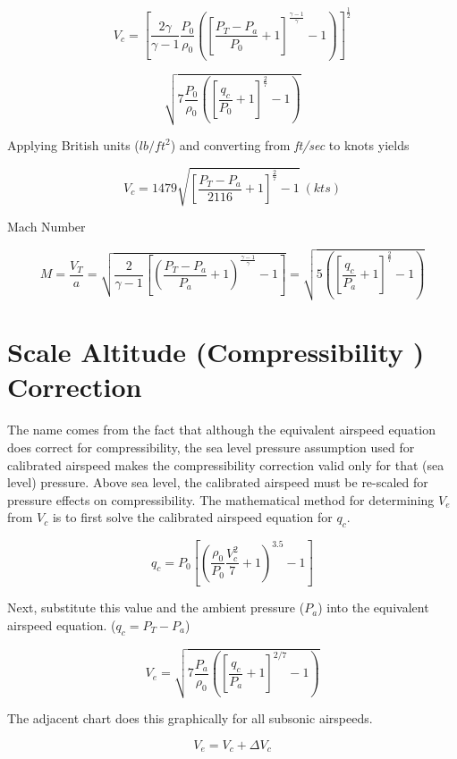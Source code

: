 \documentclass[
]{book}
\begin{document}
\[V_{c} = \left\lbrack \frac{2\gamma}{\gamma - 1}\frac{P_0}{\rho_0}\left( \left\lbrack \frac{P_{T} - P_{a}}{P_0} + 1 \right\rbrack^{\frac{\gamma - 1}{\gamma}} - 1 \right) \right\rbrack^{\frac{1}{2}}\]

\[\sqrt{7 \frac{P_0}{\rho_0}\left( \left\lbrack \frac{q_c}{P_0} + 1 \right\rbrack^{\frac{2}{7}} - 1 \right)}\]

Applying British units (\(lb/ft^2\)) and converting from \emph{ft/sec} to knots yields

\[ V_{c} = 1479\sqrt{\left\lbrack \frac{P_{T} - P_{a}}{2116} + 1 \right\rbrack^{\frac{2}{7}} - 1} ~(kts)\]

Mach Number

\[M = \frac{V_{T}}{a} = \sqrt{\frac{2}{\gamma - 1}\left\lbrack \left( \frac{P_{T} - P_{a}}{P_{a}} + 1 \right)^{\frac{\gamma - 1}{\gamma}} - 1 \right\rbrack} = \sqrt{5\left( \left\lbrack \frac{q_{c}}{P_{a}} + 1 \right\rbrack^{\frac{2}{7}} - 1 \right)}\]

\hypertarget{scale-altitude-compressibility-correction}{%
\section{Scale Altitude (Compressibility ) Correction}\label{scale-altitude-compressibility-correction}}

The name comes from the fact that although the equivalent airspeed equation does correct for compressibility, the sea level pressure assumption used for calibrated airspeed makes the compressibility correction valid only for that (sea level) pressure. Above sea level, the calibrated airspeed must be re-scaled for pressure effects on compressibility. The mathematical method for determining \(V_e\) from \(V_c\) is to first solve the calibrated airspeed equation for \(q_c\).

\[q_c = P_0  \left\lbrack \left( \frac{\rho_0}{P_0} \frac{V_c^2}{7} + 1 \right)^{3.5} - 1 \right\rbrack\]

Next, substitute this value and the ambient pressure (\(P_a\)) into the equivalent airspeed equation. (\(q_c = P_T - P_a\))

\[V_e = \sqrt{7 \frac{P_a}{\rho_0} \left( \left\lbrack \frac{q_c}{P_a}+1 \right\rbrack^{2/7} - 1 \right) } \]

The adjacent chart does this graphically for all subsonic airspeeds.

\[V_e = V_c + \Delta V_c\]
\end{document}
